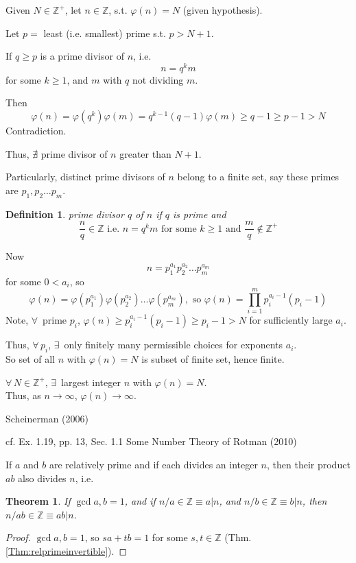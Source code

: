 \documentclass[10pt]{amsart}
\newtheorem{theorem}{Theorem}
\newtheorem{definition}{Definition}
\newcommand{\exercisehead}[1]
  { \smallskip
   \noindent{\small\bf Exercise #1.}
  }
\begin{document}
\begin{multicols*}{2}
Given $N \in \mathbb{Z}^+$, let $n \in \mathbb{Z}$, s.t. $\varphi(n) = N$ (given hypothesis).  

Let $p= $ least (i.e. smallest) prime s.t. $p > N+1$.  

If $q\geq p$ is a prime divisor of $n$, i.e. 
\[
n = q^k m 
\]
for some $k\geq 1$, and $m$ with $q$ not dividing $m$.  

Then 
\[
\varphi(n) = \varphi(q^k) \varphi(m) = q^{k-1}(q-1) \varphi(m) \geq q-1 \geq p -1 > N
\]
Contradiction.  

Thus, $\nexists$ prime divisor of $n$ greater than $N+1$.  

Particularly, distinct prime divisors of $n$ belong to a finite set, say these primes are $p_1,p_2 \dots p_m$.  

\begin{definition}
	prime divisor $q$ of $n$ if $q$ is prime and 
	\begin{equation}
	 \frac{n}{q} \in \mathbb{Z} \text{ i.e. } n =q^k m \text{ for some } k \geq 1 \text{ and } \frac{m}{q} \notin \mathbb{Z}^+
	\end{equation}
\end{definition}

Now
\[
n=p_1^{a_1}p_2^{a_2} \dots p_m^{a_m} 
\]
for some $0<a_i$, so 
\[
\varphi(n) = \varphi(p_1^{a_1}) \varphi(p_2^{a_2}) \dots \varphi( p_m^{a_m}), \text{ so } \varphi(n) = \prod_{i=1}^m p_i^{ a_i -1} (p_i-1)
\]
Note, $\forall \, $ prime $p_i$, $\varphi(n) \geq p_i^{a_i -1}(p_i-1) \geq p_i - 1 > N$ for sufficiently large $a_i$.  

Thus, $\forall \, p_i$, $\exists \, $ only finitely many permissible choices for exponents $a_i$.  \\
So set of all $n$ with $\varphi(n) = N$ is subset of finite set, hence finite.  

$\forall \, N \in \mathbb{Z}^+$, $\exists \, $ largest integer $n$ with $\varphi(n) = N$.  \\
Thus, as $n\to \infty$, $\varphi(n) \to \infty$.  







Scheinerman (2006) \cite{Sche2006}

cf. Ex. 1.19, pp. 13, Sec. 1.1 Some Number Theory of Rotman (2010) \cite{JRotman2010}
\exercisehead{1.19}
If $a$ and $b$ are relatively prime and if each divides an integer $n$, then their product $ab$ also divides $n$, i.e. 
\begin{theorem}\label{Thm:relprimeproddivisible}
	If $\gcd{a,b}=1$, and if $n/a \in \mathbb{Z} \equiv a | n$, and $n/b \in \mathbb{Z} \equiv b | n$, then $n/ab \in \mathbb{Z} \equiv ab | n$.  
\end{theorem}
\begin{proof}
	$\gcd{a,b}=1$, so $sa + tb= 1$ for some $s,t \in \mathbb{Z}$ (Thm. \ref{Thm:relprimeinvertible}).  
	

\end{proof}
\end{multicols*}
\end{document}

